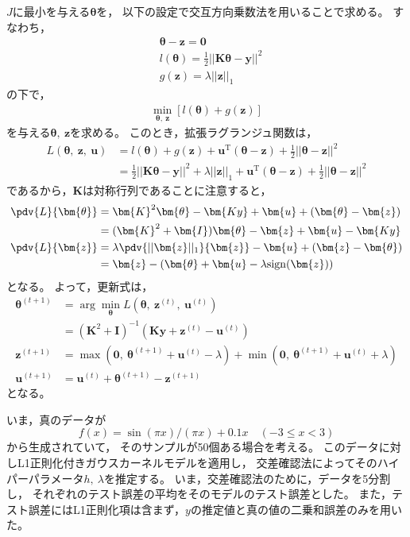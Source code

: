 \documentclass[class=jsarticle, crop=false, dvipdfmx, fleqn]{standalone}
\begin{document}
\(J\)に最小を与える\(\bm{\theta}\)を，
以下の設定で交互方向乗数法を用いることで求める。
すなわち，
\begin{align}
	& \bm{\theta} - \bm{z} = \bm{0} \\
	& l(\bm{\theta}) = \frac{1}{2} ||\bm{K \theta} - \bm{y}||^2 \\
	& g(\bm{z}) = \lambda ||\bm{z}||_1
\end{align}
の下で，
\begin{align}
	\min_{\bm{\theta},\ \bm{z}}[l(\bm{\theta}) + g(\bm{z})]
\end{align}
を与える\(\bm{\theta},\ \bm{z}\)を求める。
このとき，拡張ラグランジュ関数は，
\begin{align}
	L(\bm{\theta},\ \bm{z},\ \bm{u})
		& = l(\bm{\theta}) + g(\bm{z}) + \bm{u}^\mathrm{T} (\bm{\theta} - \bm{z}) + \frac{1}{2} ||\bm{\theta} - \bm{z}||^2 \\
		& = \frac{1}{2} ||\bm{K \theta} - \bm{y}||^2 + \lambda ||\bm{z}||_1 + \bm{u}^\mathrm{T} (\bm{\theta} - \bm{z}) + \frac{1}{2} ||\bm{\theta} - \bm{z}||^2
\end{align}
であるから，\(\bm{K}\)は対称行列であることに注意すると，
\begin{align}
	\pdv{L}{\bm{\theta}}
		& = \bm{K}^2 \bm{\theta} - \bm{K y} + \bm{u} + (\bm{\theta} - \bm{z}) \\
		& = (\bm{K}^2 + \bm{I})\bm{\theta} - \bm{z} + \bm{u} - \bm{K y} \\
	\pdv{L}{\bm{z}}
		& = \lambda \pdv{||\bm{z}||_1}{\bm{z}} - \bm{u} + (\bm{z} - \bm{\theta}) \\
		& = \bm{z} - (\bm{\theta} + \bm{u} - \lambda \mathrm{sign}(\bm{z}))
\end{align}
となる。
よって，更新式は，
\begin{align}
	\bm{\theta}^{(t+1)}
		& = \arg\min_{\bm{\theta}} L(\bm{\theta},\ \bm{z}^{(t)},\ \bm{u}^{(t)}) \\
		& = (\bm{K}^2 + \bm{I})^{-1} (\bm{K y} + \bm{z}^{(t)} - \bm{u}^{(t)}) \\
	\bm{z}^{(t+1)}
		& = \max(\bm{0},\ \bm{\theta}^{(t+1)} + \bm{u}^{(t)} - \lambda) + \min(\bm{0},\ \bm{\theta}^{(t+1)} + \bm{u}^{(t)} + \lambda) \\
	\bm{u}^{(t+1)}
		& = \bm{u}^{(t)} + \bm{\theta}^{(t+1)} - \bm{z}^{(t+1)}
\end{align}
となる。

いま，真のデータが
\begin{equation}
	f(x) = \sin(\pi x) / (\pi x) + 0.1 x
		\quad (-3 \leq x < 3 )
\end{equation}
から生成されていて，
そのサンプルが50個ある場合を考える。
このデータに対しL1正則化付きガウスカーネルモデルを適用し，
交差確認法によってそのハイパーパラメータ\(h,\ \lambda\)を推定する。
いま，交差確認法のために，データを5分割し，
それぞれのテスト誤差の平均をそのモデルのテスト誤差とした。
また，テスト誤差にはL1正則化項は含まず，\(y\)の推定値と真の値の二乗和誤差のみを用いた。
\end{document}
